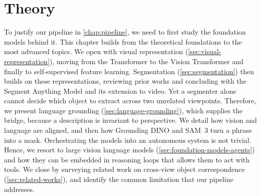 \chapter{Theory}
\label{chap:theory}
To justify our pipeline in \cref{chap:pipeline}, we need to first study the foundation models behind it. This chapter builds from the theoretical foundations to the most advanced topics. We open with visual representation (\cref{sec:visual-representation}), moving from the Transformer to the Vision Transformer and finally to self-supervised feature learning. Segmentation (\cref{sec:segmentation}) then builds on these representations, reviewing prior works and concluding with the Segment Anything Model and its extension to video. Yet a segmenter alone cannot decide which object to extract across two unrelated viewpoints. Therefore, we present language grounding (\cref{sec:language-grounding}), which supplies the bridge, because a description is invariant to perspective. We detail how vision and language are aligned, and then how Grounding DINO and SAM~3 turn a phrase into a mask. Orchestrating the models into an autonomous system is not trivial. Hence, we resort to large vision language models (\cref{sec:foundation-models-agents}) and how they can be embedded in reasoning loops that allows them to act with tools. We close by surveying related work on cross-view object correspondence (\cref{sec:related-works}), and identify the common limitation that our pipeline addresses.







